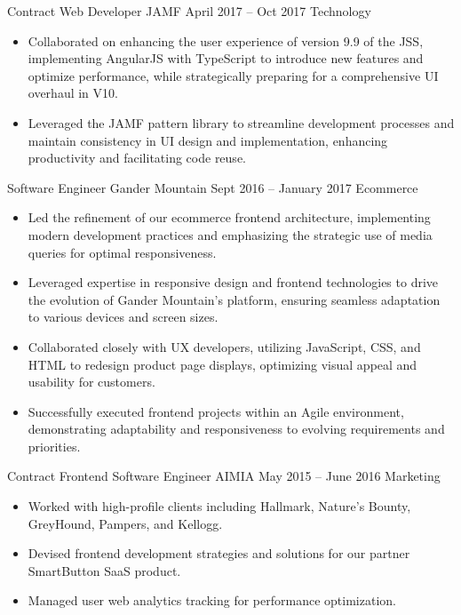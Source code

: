 \medskip
\cvexperience
{Contract Web Developer}
{JAMF}
{April 2017 – Oct 2017}
{Technology}
{\footnotesize\faCode \hspace{1pt}  }
\begin{itemize}
    \item Collaborated on enhancing the user experience of version 9.9 of the JSS, implementing AngularJS with TypeScript to introduce new features and optimize performance, while strategically preparing for a comprehensive UI overhaul in V10.
    \item Leveraged the JAMF pattern library to streamline development processes and maintain consistency in UI design and implementation, enhancing productivity and facilitating code reuse.
\end{itemize}

\medskip

\cvexperience
{Software Engineer}
{Gander Mountain}
{Sept 2016 – January 2017}
{Ecommerce}
{\footnotesize\faCode \hspace{1pt}      }
\begin{itemize}
    \item Led the refinement of our ecommerce frontend architecture, implementing modern development practices and emphasizing the strategic use of media queries for optimal responsiveness.
    \item Leveraged expertise in responsive design and frontend technologies to drive the evolution of Gander Mountain's platform, ensuring seamless adaptation to various devices and screen sizes.
    \item Collaborated closely with UX developers, utilizing JavaScript, CSS, and HTML to redesign product page displays, optimizing visual appeal and usability for customers.
    \item Successfully executed frontend projects within an Agile environment, demonstrating adaptability and responsiveness to evolving requirements and priorities.
\end{itemize}


\medskip
\cvexperience
{Contract Frontend Software Engineer}
{AIMIA}
{May 2015 – June 2016}
{Marketing}
{\footnotesize\faCode \hspace{1pt}      }
\begin{itemize}
    \item Worked with high-profile clients including Hallmark, Nature’s Bounty, GreyHound, Pampers, and Kellogg.
    \item Devised frontend development strategies and solutions for our partner SmartButton SaaS product.
    \item Managed user web analytics tracking for performance optimization.
\end{itemize}

